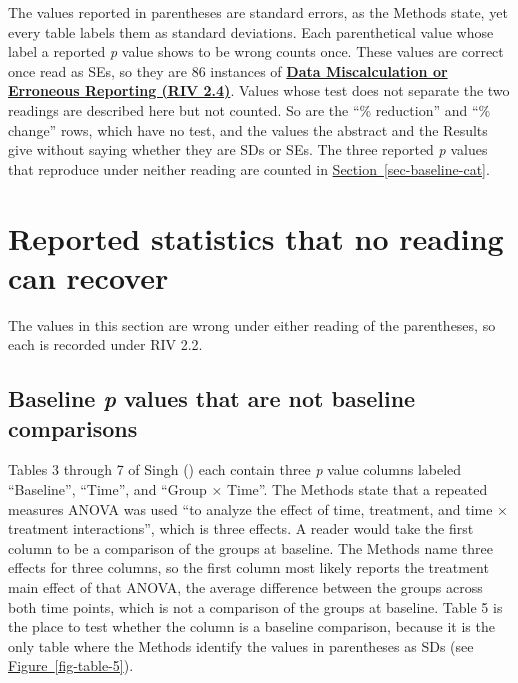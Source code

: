 \documentclass[
  letterpaper,
  DIV=11,
  numbers=noendperiod]{scrartcl}
\begin{document}
The values reported in parentheses are standard errors, as the Methods
state, yet every table labels them as standard deviations. Each
parenthetical value whose label a reported \emph{p} value shows to be
wrong counts once. These values are correct once read as SEs, so they
are 86 instances of
\href{https://auditclinicalevidence.org/riv.html#riv-2-4}{\textcolor{acerivblue}{\textbf{Data Miscalculation or Erroneous Reporting (RIV 2.4)}}}.
Values whose test does not separate the two readings are described here
but not counted. So are the ``\% reduction'' and ``\% change'' rows,
which have no test, and the values the abstract and the Results give
without saying whether they are SDs or SEs. The three reported \emph{p}
values that reproduce under neither reading are counted in
\hyperref[sec-baseline-cat]{Section~\ref*{sec-baseline-cat}}.

\section{Reported statistics that no reading can
recover}\label{sec-unrecoverable}

The values in this section are wrong under either reading of the
parentheses, so each is recorded under RIV 2.2.

\subsection{\texorpdfstring{Baseline \emph{p} values that are not
baseline
comparisons}{Baseline p values that are not baseline comparisons}}\label{sec-baseline-column}

Tables 3 through 7 of Singh () each
contain three \emph{p} value columns labeled ``Baseline'', ``Time'', and
``Group × Time''. The Methods state that a repeated measures ANOVA was
used ``to analyze the effect of time, treatment, and time × treatment
interactions'', which is three effects. A reader would take the first
column to be a comparison of the groups at baseline. The Methods name
three effects for three columns, so the first column most likely reports
the treatment main effect of that ANOVA, the average difference between
the groups across both time points, which is not a comparison of the
groups at baseline. Table 5 is the place to test whether the column is a
baseline comparison, because it is the only table where the Methods
identify the values in parentheses as SDs (see
\hyperref[fig-table-5]{Figure~\ref*{fig-table-5}}).
\end{document}
